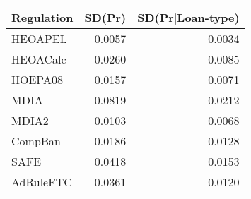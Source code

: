 \begin{tabular}{lrr}
  \hline
Regulation & SD(Pr) & SD(Pr$|$Loan-type) \\ 
  \hline
HEOAPEL & 0.0057 & 0.0034 \\ 
  HEOACalc & 0.0260 & 0.0085 \\ 
  HOEPA08 & 0.0157 & 0.0071 \\ 
  MDIA & 0.0819 & 0.0212 \\ 
  MDIA2 & 0.0103 & 0.0068 \\ 
  CompBan & 0.0186 & 0.0128 \\ 
  SAFE & 0.0418 & 0.0153 \\ 
  AdRuleFTC & 0.0361 & 0.0120 \\ 
   \hline
\end{tabular}
